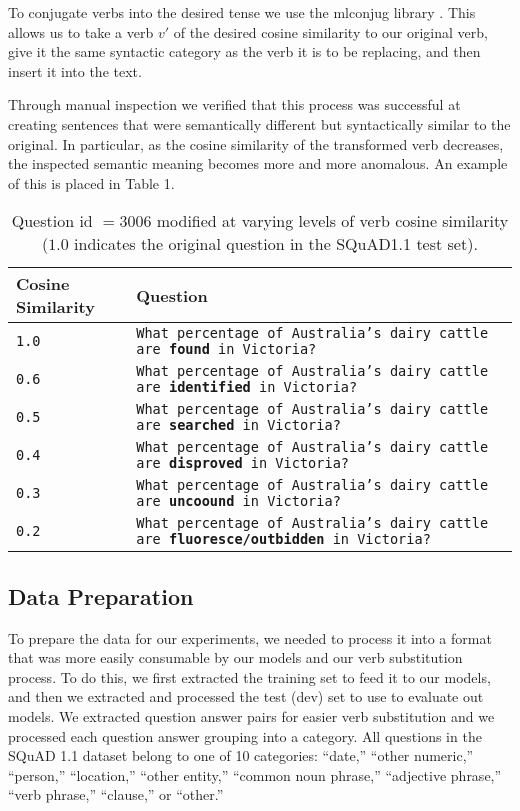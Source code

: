 \documentclass[11pt,a4paper]{article}
\begin{document}
To conjugate verbs into the desired tense we use the mlconjug library \cite{mlconjug3}. This allows us to take a verb $v'$ of the desired cosine similarity to our original verb, give it the same syntactic category as the verb it is to be replacing, and then insert it into the text. 

Through manual inspection we verified that this process was successful at creating sentences that were semantically different but syntactically similar to the original. In particular, as the cosine similarity of the transformed verb decreases, the inspected semantic meaning becomes more and more anomalous. An example of this is placed in Table 1. 

\begin{table}
\centering
\small

\begin{tabular}{|p{2.35cm}|p{4.4cm}|}
\hline
\textbf{Cosine Similarity} & \textbf{Question}\\\hline
\verb$1.0$ & \texttt{What percentage of Australia's dairy cattle are \textbf{found} in Victoria?}\\\hline
\verb$0.6$ & \texttt{What percentage of Australia's dairy cattle are \textbf{identified} in Victoria?}\\\hline
\verb$0.5$ & \texttt{What percentage of Australia's dairy cattle are \textbf{searched} in Victoria?}\\\hline
\verb$0.4$& \texttt{What percentage of Australia's dairy cattle are \textbf{disproved} in Victoria?}\\\hline
\verb$0.3$ & \texttt{What percentage of Australia's dairy cattle are \textbf{uncoound} in Victoria?}\\\hline
\verb$0.2$ & \texttt{What percentage of Australia's dairy cattle are \textbf{fluoresce/outbidden} in Victoria?}\\\hline
\end{tabular}

\caption{Question id $=3006$ modified at varying levels of verb cosine similarity ($1.0$ indicates the original question in the SQuAD1.1 test set).}\label{tab:accents}
\end{table}


\subsection{Data Preparation}

To prepare the data for our experiments, we needed to process it into a format that was more easily consumable by our models and our verb substitution process. To do this, we first extracted the training set to feed it to our models, and then we extracted and processed the test (dev) set to use to evaluate out models. We extracted question answer pairs for easier verb substitution and we processed each question answer grouping into a category. All questions in the SQuAD 1.1 dataset belong to one of 10 categories: ``date,'' ``other numeric,'' ``person,'' ``location,'' ``other entity,'' ``common noun phrase,'' ``adjective phrase,'' ``verb phrase,'' ``clause,'' or ``other.'' 
\end{document}
